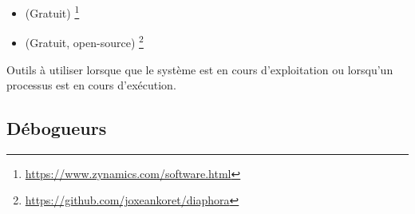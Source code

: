 \begin{itemize}
\item (Gratuit) \footnote{\url{https://www.zynamics.com/software.html}}

\item (Gratuit, open-source) \footnote{\url{https://github.com/joxeankoret/diaphora}}
\end{itemize}


Outils à utiliser lorsque que le système est en cours d'exploitation ou lorsqu'un processus est en cours d'exécution.

\subsection{Débogueurs}

\myindex{\olly}

